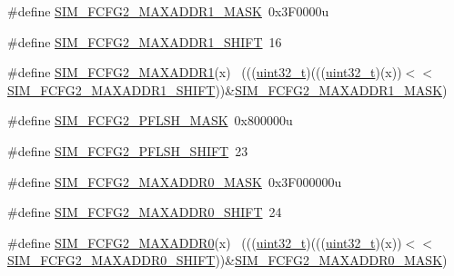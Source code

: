 \begin{DoxyCompactItemize}
\item 
\#define \hyperlink{group___s_i_m___register___masks_ga4a9efde69ef5ab882d94b4ff6f659493}{S\+I\+M\+\_\+\+F\+C\+F\+G2\+\_\+\+M\+A\+X\+A\+D\+D\+R1\+\_\+\+M\+A\+SK}~0x3\+F0000u
\item 
\#define \hyperlink{group___s_i_m___register___masks_ga4efd23d8fd9d589919b9b211ab523e09}{S\+I\+M\+\_\+\+F\+C\+F\+G2\+\_\+\+M\+A\+X\+A\+D\+D\+R1\+\_\+\+S\+H\+I\+FT}~16
\item 
\#define \hyperlink{group___s_i_m___register___masks_gada0b2c0c77aa9caa61db855f310a22de}{S\+I\+M\+\_\+\+F\+C\+F\+G2\+\_\+\+M\+A\+X\+A\+D\+D\+R1}(x)                                    ~(((\hyperlink{_p_e___types_8h_a33594304e786b158f3fb30289278f5af}{uint32\+\_\+t})(((\hyperlink{_p_e___types_8h_a33594304e786b158f3fb30289278f5af}{uint32\+\_\+t})(x))$<$$<$\hyperlink{group___s_i_m___register___masks_ga4efd23d8fd9d589919b9b211ab523e09}{S\+I\+M\+\_\+\+F\+C\+F\+G2\+\_\+\+M\+A\+X\+A\+D\+D\+R1\+\_\+\+S\+H\+I\+FT}))\&\hyperlink{group___s_i_m___register___masks_ga4a9efde69ef5ab882d94b4ff6f659493}{S\+I\+M\+\_\+\+F\+C\+F\+G2\+\_\+\+M\+A\+X\+A\+D\+D\+R1\+\_\+\+M\+A\+SK})
\item 
\#define \hyperlink{group___s_i_m___register___masks_ga4d534ca03b47525916b93f9b2000d49a}{S\+I\+M\+\_\+\+F\+C\+F\+G2\+\_\+\+P\+F\+L\+S\+H\+\_\+\+M\+A\+SK}~0x800000u
\item 
\#define \hyperlink{group___s_i_m___register___masks_ga6ebc783954b7a0846e166efc03ca3a30}{S\+I\+M\+\_\+\+F\+C\+F\+G2\+\_\+\+P\+F\+L\+S\+H\+\_\+\+S\+H\+I\+FT}~23
\item 
\#define \hyperlink{group___s_i_m___register___masks_gad1096c0a75d0bf4dfc93f4b1957fe493}{S\+I\+M\+\_\+\+F\+C\+F\+G2\+\_\+\+M\+A\+X\+A\+D\+D\+R0\+\_\+\+M\+A\+SK}~0x3\+F000000u
\item 
\#define \hyperlink{group___s_i_m___register___masks_ga3ccb8fde0ef2e170d0c84cdfa3651d34}{S\+I\+M\+\_\+\+F\+C\+F\+G2\+\_\+\+M\+A\+X\+A\+D\+D\+R0\+\_\+\+S\+H\+I\+FT}~24
\item 
\#define \hyperlink{group___s_i_m___register___masks_gaba3b670134023f4c71398fd21f4ba0fe}{S\+I\+M\+\_\+\+F\+C\+F\+G2\+\_\+\+M\+A\+X\+A\+D\+D\+R0}(x)                                    ~(((\hyperlink{_p_e___types_8h_a33594304e786b158f3fb30289278f5af}{uint32\+\_\+t})(((\hyperlink{_p_e___types_8h_a33594304e786b158f3fb30289278f5af}{uint32\+\_\+t})(x))$<$$<$\hyperlink{group___s_i_m___register___masks_ga3ccb8fde0ef2e170d0c84cdfa3651d34}{S\+I\+M\+\_\+\+F\+C\+F\+G2\+\_\+\+M\+A\+X\+A\+D\+D\+R0\+\_\+\+S\+H\+I\+FT}))\&\hyperlink{group___s_i_m___register___masks_gad1096c0a75d0bf4dfc93f4b1957fe493}{S\+I\+M\+\_\+\+F\+C\+F\+G2\+\_\+\+M\+A\+X\+A\+D\+D\+R0\+\_\+\+M\+A\+SK})

\end{DoxyCompactItemize}
